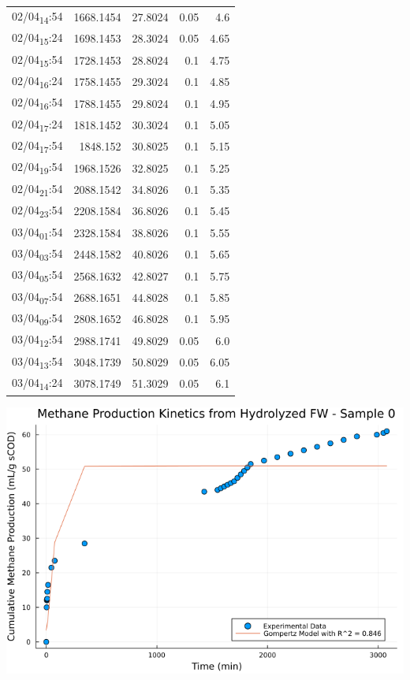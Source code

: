 \documentclass[11pt]{article}
\begin{document}
\begin{center}
\begin{tabular}{lrrrr}
02/04\textsubscript{14}:54 & 1668.1454 & 27.8024 & 0.05 & 4.6\\[0pt]
02/04\textsubscript{15}:24 & 1698.1453 & 28.3024 & 0.05 & 4.65\\[0pt]
02/04\textsubscript{15}:54 & 1728.1453 & 28.8024 & 0.1 & 4.75\\[0pt]
02/04\textsubscript{16}:24 & 1758.1455 & 29.3024 & 0.1 & 4.85\\[0pt]
02/04\textsubscript{16}:54 & 1788.1455 & 29.8024 & 0.1 & 4.95\\[0pt]
02/04\textsubscript{17}:24 & 1818.1452 & 30.3024 & 0.1 & 5.05\\[0pt]
02/04\textsubscript{17}:54 & 1848.152 & 30.8025 & 0.1 & 5.15\\[0pt]
02/04\textsubscript{19}:54 & 1968.1526 & 32.8025 & 0.1 & 5.25\\[0pt]
02/04\textsubscript{21}:54 & 2088.1542 & 34.8026 & 0.1 & 5.35\\[0pt]
02/04\textsubscript{23}:54 & 2208.1584 & 36.8026 & 0.1 & 5.45\\[0pt]
03/04\textsubscript{01}:54 & 2328.1584 & 38.8026 & 0.1 & 5.55\\[0pt]
03/04\textsubscript{03}:54 & 2448.1582 & 40.8026 & 0.1 & 5.65\\[0pt]
03/04\textsubscript{05}:54 & 2568.1632 & 42.8027 & 0.1 & 5.75\\[0pt]
03/04\textsubscript{07}:54 & 2688.1651 & 44.8028 & 0.1 & 5.85\\[0pt]
03/04\textsubscript{09}:54 & 2808.1652 & 46.8028 & 0.1 & 5.95\\[0pt]
03/04\textsubscript{12}:54 & 2988.1741 & 49.8029 & 0.05 & 6.0\\[0pt]
03/04\textsubscript{13}:54 & 3048.1739 & 50.8029 & 0.05 & 6.05\\[0pt]
03/04\textsubscript{14}:24 & 3078.1749 & 51.3029 & 0.05 & 6.1\\[0pt]
\end{tabular}
\end{center}

\begin{center}
\includegraphics[width=.9\linewidth]{../plots/BMPs/Hydrolyzed FW/methane_kinetics_hydrolysate_0_min.png}
\end{center}
\end{document}
